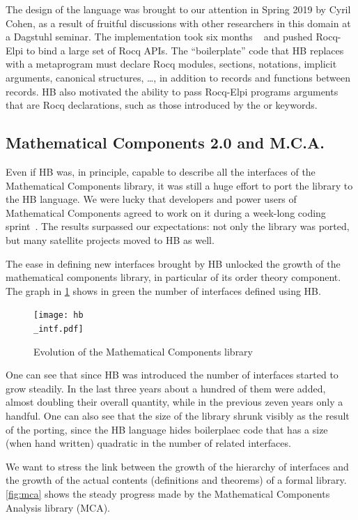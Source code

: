 \documentclass[a4paper, 11pt]{book}
\begin{document}
The design of the language was brought to our attention in Spring 2019 by Cyril
Cohen, as a result of fruitful discussions with other researchers in this
domain at a Dagstuhl seminar. The implementation took six months
~\cite{cohen_et_al:LIPIcs.FSCD.2020.34} and pushed Rocq-Elpi to bind a large
set of Rocq APIs. The ``boilerplate'' code that HB replaces with a metaprogram
must declare Rocq modules, sections, notations, implicit arguments, canonical
structures, \ldots, in addition to records and functions between records. HB
also motivated the ability to pass Rocq-Elpi programs arguments that are Rocq
declarations, such as those introduced by the  or
 keywords.


\subsection{Mathematical Components 2.0 and M.C.A.}

Even if HB was, in principle, capable to describe all the interfaces of
the Mathematical Components library, it was still a huge effort to port the
library to the HB language.  We were lucky that developers and power users of
Mathematical Components agreed to work on it during a week-long coding
sprint~\cite{affeldt:hal-03463762}. The results surpassed our expectations:
not only the library was ported, but many satellite projects moved to
HB as well.

The ease in defining new interfaces brought by HB unlocked 
the growth of the mathematical components library, in particular of
its order theory component. The graph in \cref{fig:mc} shows in green the
number of interfaces defined using HB.

\begin{figure}[!ht]
\texttt{[image: hb\\\_intf.pdf]}
\caption{Evolution of the Mathematical Components library\label{fig:mc}}
\end{figure}

One can see that since HB was introduced the number of
interfaces started to grow steadily. In the last three years about a hundred
of them were added, almost doubling their overall quantity,
while in the previous zeven years only a handful.
One can also see that the size of the library shrunk visibly as the result of
the porting, since the HB language hides boilerplaec code that has a size
(when hand written) quadratic in the number of related interfaces.

We want to stress the link between the growth of the hierarchy of interfaces and
the growth of the actual contents (definitions and theorems) of a formal
library. \cref{fig:mca} shows the steady progress made by the
Mathematical Components Analysis library (MCA).
\end{document}
